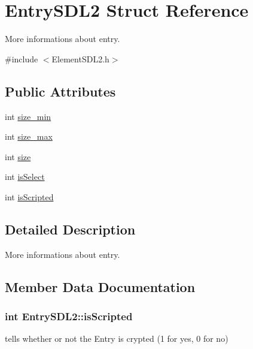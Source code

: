 \hypertarget{structEntrySDL2}{}\section{Entry\+S\+D\+L2 Struct Reference}
\label{structEntrySDL2}


More informations about entry.  




{\ttfamily \#include $<$Element\+S\+D\+L2.\+h$>$}

\subsection*{Public Attributes}
\begin{DoxyCompactItemize}
\item 
int \hyperlink{structEntrySDL2_a6713933ba31b9a8f3436dbc93f205340}{size\+\_\+min}
\item 
int \hyperlink{structEntrySDL2_a527d25625060a6f0770873b1c3039f73}{size\+\_\+max}
\item 
int \hyperlink{structEntrySDL2_adad4bfa55d814798c0198b3dc1b17514}{size}
\item 
int \hyperlink{structEntrySDL2_a92de743f9f3ea22c88f132f05793ba0b}{is\+Select}
\item 
int \hyperlink{structEntrySDL2_ad367cfeed2432de311c8da686075fe42}{is\+Scripted}
\end{DoxyCompactItemize}


\subsection{Detailed Description}
More informations about entry. 

\subsection{Member Data Documentation}
\subsubsection[{\texorpdfstring{is\+Scripted}{isScripted}}]{\setlength{\rightskip}{0pt plus 5cm}int Entry\+S\+D\+L2\+::is\+Scripted}\hypertarget{structEntrySDL2_ad367cfeed2432de311c8da686075fe42}{}\label{structEntrySDL2_ad367cfeed2432de311c8da686075fe42}
tells whether or not the Entry is crypted (1 for yes, 0 for no) 
